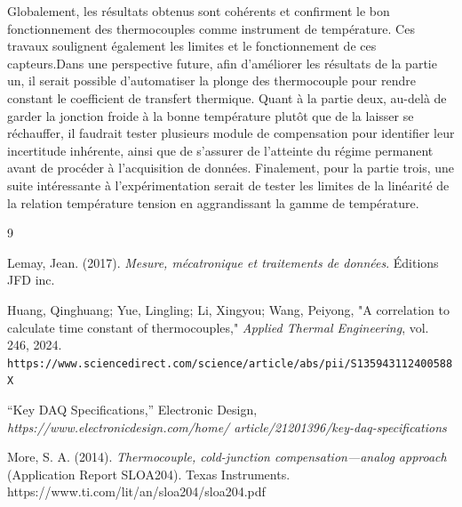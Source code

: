 \documentclass[11pt,twoside]{article}
\numberwithin{figure}{section}
\begin{document}
Globalement, les résultats obtenus sont cohérents et confirment le bon fonctionnement des thermocouples comme instrument de température. Ces travaux soulignent également les limites et le fonctionnement de ces capteurs.Dans une perspective future, afin d'améliorer les résultats de la partie un, il serait possible d'automatiser la plonge des thermocouple pour rendre constant le coefficient de transfert thermique. Quant à la partie deux, au-delà de garder la jonction froide à la bonne température plutôt que de la laisser se réchauffer, il faudrait tester plusieurs module de compensation pour identifier leur incertitude inhérente, ainsi que de s'assurer de l'atteinte du régime permanent avant de procéder à l'acquisition de données. Finalement, pour la partie trois, une suite intéressante à l'expérimentation serait de tester les limites de la linéarité de la relation température tension en aggrandissant la gamme de température.
\newpage
\thispagestyle{empty}
\begin{thebibliography}{9}

Lemay, Jean.
(2017).
\textit{Mesure, mécatronique et traitements de données}.
Éditions JFD inc.


Huang, Qinghuang; Yue, Lingling; Li, Xingyou; Wang, Peiyong, 
"A correlation to calculate time constant of thermocouples," 
\textit{Applied Thermal Engineering}, vol. 246, 2024.  \texttt{https://www.sciencedirect.com/science/article/abs/pii/S135943112400588X}

“Key DAQ Specifications,” Electronic Design, 
\textit{https://www.electronicdesign.com/home/
article/21201396/key-daq-specifications}

More, S. A. (2014). 
\textit{Thermocouple, cold-junction compensation—analog approach} (Application Report SLOA204). Texas Instruments. https://www.ti.com/lit/an/sloa204/sloa204.pdf

\end{thebibliography}
\end{document}
